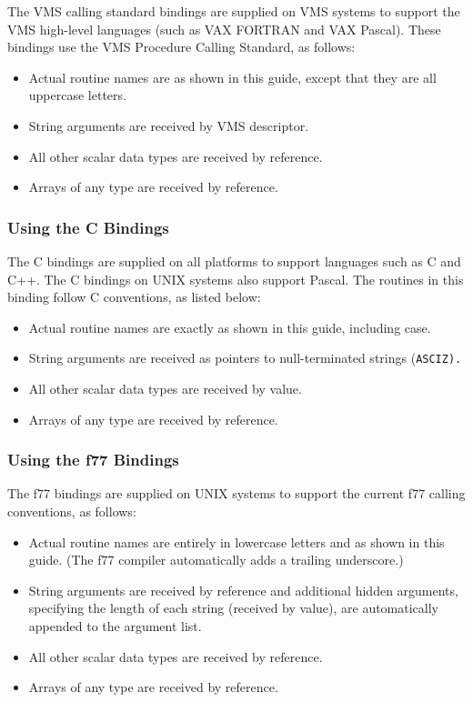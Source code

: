 The VMS calling standard bindings are supplied on VMS systems to
support the VMS high-level languages (such as VAX FORTRAN and VAX
Pascal). These bindings use the VMS Procedure Calling Standard, as
follows:

\begin{itemize}
\item Actual routine names are as shown in this guide, except that
  they are all uppercase letters.
\item String arguments are received by VMS descriptor.
\item All other scalar data types are received by reference.
\item Arrays of any type are received by reference.
\end{itemize}

\subsubsection{Using the C Bindings}

The C bindings are supplied on all platforms to support languages such
as C and C++. The C bindings on UNIX systems also support Pascal. The
routines in this binding follow C conventions, as listed below:

\begin{itemize}
\item Actual routine names are exactly as shown in this guide,
  including case.
\item String arguments are received as pointers to null-terminated
  strings (\tt{ASCIZ}).
\item All other scalar data types are received by value.
\item Arrays of any type are received by reference.
\end{itemize}

\subsubsection{Using the f77 Bindings}

The f77 bindings are supplied on UNIX systems to support the current
f77 calling conventions, as follows:

\begin{itemize}
\item Actual routine names are entirely in lowercase letters and as
  shown in this guide. (The f77 compiler automatically adds a trailing
  underscore.)
\item String arguments are received by reference and additional hidden
  arguments, specifying the length of each string (received by value),
  are automatically appended to the argument list.
\item All other scalar data types are received by reference.
\item Arrays of any type are received by reference.
\end{itemize}

